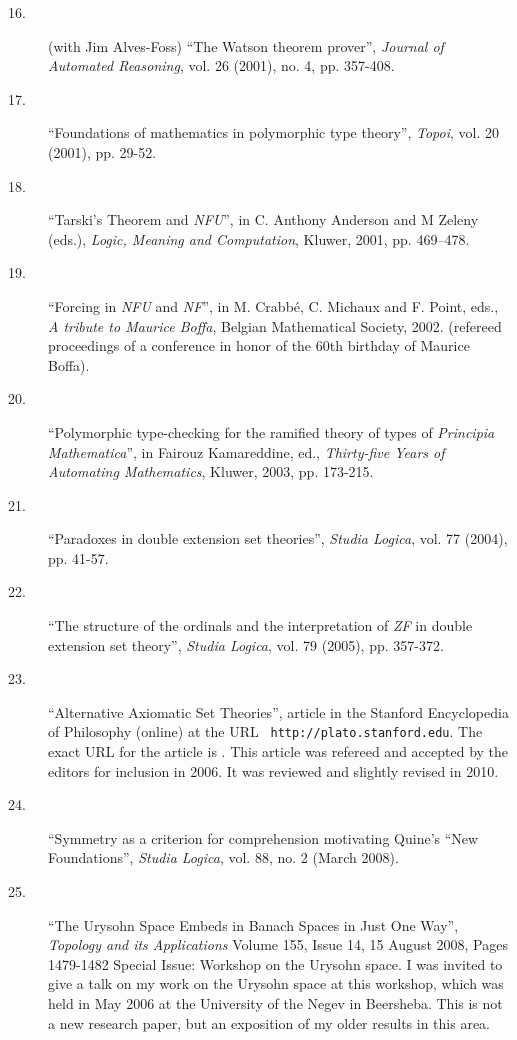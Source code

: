 \begin{description}
\begin{description}
\item[16.]  (with Jim Alves-Foss) ``The Watson theorem prover'', {\em
Journal of Automated Reasoning\/}, vol. 26 (2001), no. 4, pp. 357-408.

\item[17.]  ``Foundations of mathematics in polymorphic type theory'',
{\em Topoi\/}, vol. 20 (2001), pp. 29-52.

\item[18.]  ``Tarski's Theorem and {\em NFU\/}'', in C. Anthony
Anderson and M Zeleny (eds.), {\em Logic, Meaning and Computation\/},
Kluwer, 2001, pp. 469--478.

\item[19.]  ``Forcing in {\em NFU\/} and {\em NF\/}'', in M. Crabb\'e,
C. Michaux and F. Point, eds., {\em A tribute to Maurice Boffa\/},
Belgian Mathematical Society, 2002.  (refereed proceedings of a
conference in honor of the 60th birthday of Maurice Boffa).

\item[20.]  ``Polymorphic type-checking for the ramified theory of
types of {\em Principia Mathematica\/}'', in Fairouz Kamareddine, ed.,
{\em Thirty-five Years of Automating Mathematics\/}, Kluwer, 2003,
pp. 173-215.

\item[21.]  ``Paradoxes in double extension set theories'', {\em Studia Logica\/}, vol. 77 (2004), pp. 41-57.

\item[22.]  ``The structure of the ordinals and the interpretation of
{\em ZF\/} in double extension set theory'', {\em Studia
Logica\/}, vol. 79 (2005), pp. 357-372.

\item[23.] ``Alternative Axiomatic Set Theories'', article in the
Stanford Encyclopedia of Philosophy (online) at the URL {\tt
http://plato.stanford.edu}.  The exact URL for the article is .  This
article was refereed and accepted by the editors for inclusion in
2006.  It was reviewed and slightly revised in 2010.

\item[24.] ``Symmetry as a criterion for comprehension motivating
Quine's ``New Foundations'', {\em Studia Logica\/}, vol. 88, no. 2
(March 2008).

\item[25.] ``The Urysohn Space Embeds in Banach Spaces in Just One
Way'', {\em Topology and its Applications\/} Volume 155, Issue 14, 15
August 2008, Pages 1479-1482 Special Issue: Workshop on the Urysohn
space.  I was invited to give a talk on my work on the Urysohn space
at this workshop, which was held in May 2006 at the University of the
Negev in Beersheba.  This is not a new research paper, but an
exposition of my older results in this area.


\end{description}
\end{description}

